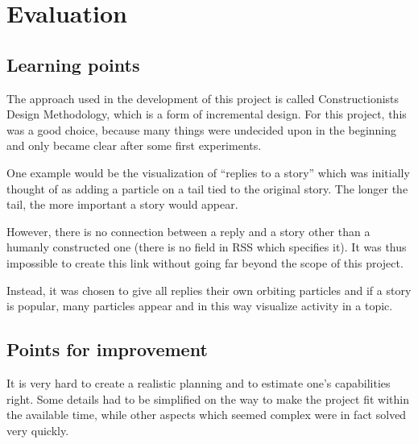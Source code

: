 \chapter{\label{cpt:evaluation}Evaluation}

\section{Learning points}

The approach used in the development of this project is called
Constructionists Design Methodology, which is a form of incremental
design. For this project, this was a good choice, because many things were
undecided upon in the beginning and only became clear after some first
experiments.

One example would be the visualization of ``replies to a story'' which was
initially thought of as adding a particle on a tail tied to the original
story. The longer the tail, the more important a story would appear.

However, there is no connection between a reply and a story other than a
humanly constructed one (there is no field in RSS which specifies it). It
was thus impossible to create this link without going far beyond the scope
of this project.

Instead, it was chosen to give all replies their own orbiting particles
and if a story is popular, many particles appear and in this way visualize
activity in a topic.

\section{Points for improvement}

It is very hard to create a realistic planning and to estimate one's
capabilities right. Some details had to be simplified on the way to make
the project fit within the available time, while other aspects which
seemed complex were in fact solved very quickly.

